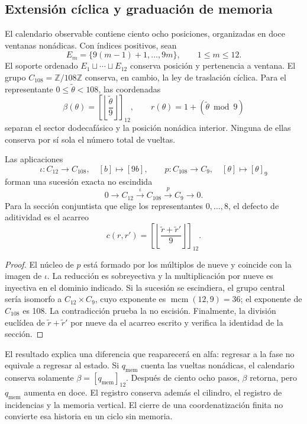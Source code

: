 

\subsection{Extensión cíclica y graduación de memoria}
\label{subsec:k-calendario}

El calendario observable contiene ciento ocho posiciones, organizadas en
doce ventanas nonádicas. Con índices positivos, sean
\[
 E_m=\{9(m-1)+1,\ldots,9m\},\qquad 1\leq m\leq12.
\]
El soporte ordenado \(E_1\sqcup\cdots\sqcup E_{12}\) conserva posición y
pertenencia a ventana. El grupo \(C_{108}=\mathbb Z/108\mathbb Z\)
conserva, en cambio, la ley de traslación cíclica. Para el representante
\(0\leq\widetilde\theta<108\), las coordenadas
\[
 \beta(\theta)=\left[\left\lfloor\frac{\widetilde\theta}{9}\right\rfloor\right]_{12},
 \qquad r(\theta)=1+(\widetilde\theta\bmod9)
\]
separan el sector dodecafásico y la posición nonádica interior. Ninguna de
ellas conserva por sí sola el número total de vueltas.

\begin{proposition}
\label{prop:k-extension}
Las aplicaciones
\[
 \iota:C_{12}\longrightarrow C_{108},\quad[b]\longmapsto[9b],
 \qquad p:C_{108}\longrightarrow C_9,\quad[\theta]\longmapsto[\theta]_9
\]
forman una sucesión exacta no escindida
\[
 0\longrightarrow C_{12}\xrightarrow{\iota}C_{108}
 \xrightarrow{p}C_9\longrightarrow0.
\]
Para la sección conjuntista que elige los representantes
\(0,\ldots,8\), el defecto de aditividad es el acarreo
\[
 c(r,r')=\left[\left\lfloor\frac{\widetilde r+\widetilde r'}9\right\rfloor\right]_{12}.
\]
\end{proposition}

\begin{proof}
El núcleo de \(p\) está formado por los múltiplos de nueve y coincide con
la imagen de \(\iota\). La reducción es sobreyectiva y la multiplicación
por nueve es inyectiva en el dominio indicado. Si la sucesión se
escindiera, el grupo central sería isomorfo a \(C_{12}\times C_9\), cuyo
exponente es \(\operatorname{mcm}(12,9)=36\); el exponente de
\(C_{108}\) es 108. La contradicción prueba la no escisión. Finalmente,
la división euclídea de \(\widetilde r+\widetilde r'\) por nueve da el
acarreo escrito y verifica la identidad de la sección.
\end{proof}

El resultado explica una diferencia que reaparecerá en alfa: regresar a la
fase no equivale a regresar al estado. Si \(q_{\mathrm{mem}}\) cuenta las
vueltas nonádicas, el calendario conserva solamente
\(\beta=[q_{\mathrm{mem}}]_{12}\). Después de ciento ocho pasos,
\(\beta\) retorna, pero \(q_{\mathrm{mem}}\) aumenta en doce. El
registro conserva además el cilindro, el registro de incidencias y la memoria
vertical. El cierre de una coordenatización finita no convierte esa historia en un
ciclo sin memoria.

